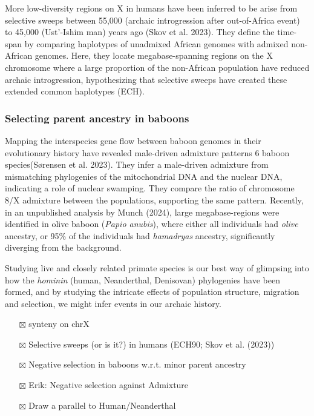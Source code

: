 \documentclass[
  11pt,
  a4paper,
]{scrbook}
\providecommand{\tightlist}{%
  \setlength{\itemsep}{0pt}\setlength{\parskip}{0pt}}\usepackage{longtable,booktabs,array}
\let\oldemph\emph
\renewcommand\emph[1]{\oldemph{\color{gray}#1}}
\begin{document}
More low-diversity regions on X in humans have been inferred to be arise
from selective sweeps between 55,000 (archaic introgression after
out-of-Africa event) to 45,000 (Ust'-Ishim man) years ago (Skov et al.
2023). They define the time-span by comparing haplotypes of unadmixed
African genomes with admixed non-African genomes. Here, they locate
megabase-spanning regions on the X chromosome where a large proportion
of the non-African population have reduced archaic introgression,
hypothesizing that selective sweeps have created these extended common
haplotypes (ECH).

\subsubsection{Selecting parent ancestry in
baboons}\label{selecting-parent-ancestry-in-baboons}

Mapping the interspecies gene flow between baboon genomes in their
evolutionary history have revealed male-driven admixture patterns 6
baboon species(Sørensen et al. 2023). They infer a male-driven admixture
from mismatching phylogenies of the mitochondrial DNA and the nuclear
DNA, indicating a role of nuclear swamping. They compare the ratio of
chromosome 8/X admixture between the populations, supporting the same
pattern. Recently, in an unpublished analysis by Munch (2024), large
megabase-regions were identified in olive baboon (\emph{Papio anubis}),
where either all individuals had \emph{olive} ancestry, or 95\% of the
individuals had \emph{hamadryas} ancestry, significantly diverging from
the background.

Studying live and closely related primate species is our best way of
glimpsing into how the \emph{hominin} (human, Neanderthal, Denisovan)
phylogenies have been formed, and by studying the intricate effects of
population structure, migration and selection, we might infer events in
our archaic history.

\begin{itemize}
\tightlist
\item[$\boxtimes$]
  synteny on chrX
\item[$\boxtimes$]
  Selective sweeps (or is it?) in humans (ECH90; Skov et al. (2023))
\item[$\boxtimes$]
  Negative selection in baboons w.r.t. minor parent ancestry
\item[$\boxtimes$]
  Erik: Negative selection against Admixture
\item[$\boxtimes$]
  Draw a parallel to Human/Neanderthal
\end{itemize}
\end{document}
